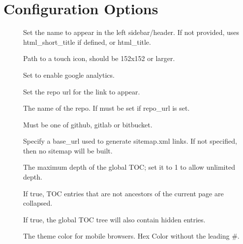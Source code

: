 \documentclass[letterpaper,10pt,english]{sphinxmanual}
\begin{document}
\section{Configuration Options}
\label{\detokenize{customization:configuration-options}}\begin{description}
\item[{}] \leavevmode
Set the name to appear in the left sidebar/header. If not provided, uses
html\_short\_title if defined, or html\_title.

\item[{}] \leavevmode
Path to a touch icon, should be 152x152 or larger.

\item[{}] \leavevmode
Set to enable google analytics.

\item[{}] \leavevmode
Set the repo url for the link to appear.

\item[{}] \leavevmode
The name of the repo. If must be set if repo\_url is set.

\item[{}] \leavevmode
Must be one of github, gitlab or bitbucket.

\item[{}] \leavevmode
Specify a base\_url used to generate sitemap.xml links. If not specified, then
no sitemap will be built.

\item[{}] \leavevmode
The maximum depth of the global TOC; set it to \sphinxhyphen{}1 to allow unlimited depth.

\item[{}] \leavevmode
If true, TOC entries that are not ancestors of the current page are collapsed.

\item[{}] \leavevmode
If true, the global TOC tree will also contain hidden entries.

\item[{}] \leavevmode
The theme color for mobile browsers. Hex Color without the leading \#.


\end{description}
\end{document}
